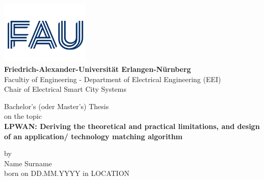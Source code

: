 
\begin{titlepage}

			\vspace{0.5cm}
			
			\begin{center}
			
				\includegraphics[height=3cm]{img/titlepage_LT/FAU_only_logo} \\
				\large{\textbf{Friedrich-Alexander-Universität Erlangen-Nürnberg}}\\
				\large{Facultiy of Engineering} -
				\large{Department of Electrical Engineering (EEI)} \\
				\large{Chair of Electrical Smart City Systems} \\			
			
				\vspace{7mm}
				
				\LARGE{Bachelor's (oder Master's) Thesis} \\
				\normalsize{on the topic}\\
				
				\vspace{5mm}
				\Large{\textbf{LPWAN: Deriving the theoretical and practical limitations, and design of an application/ technology matching algorithm}\\}			

				\vspace{5mm}

				\normalsize{by}\\

				\vspace{5mm}
	            \Large{Name Surname} \\
	            \normalsize{born on DD.MM.YYYY in LOCATION} \\
	            
				\vspace{7mm}
				

\end{center}
\end{titlepage}
